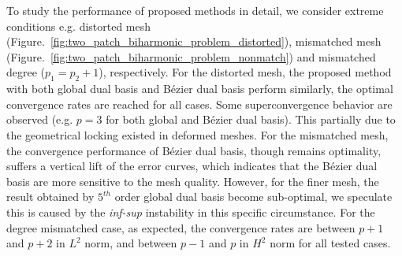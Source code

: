 \documentclass[preprint,12pt]{elsarticle}
\theoremstyle{remark}
\begin{document}
To study the performance of proposed methods in detail, we consider extreme conditions e.g. distorted mesh (Figure.~\ref{fig:two_patch_biharmonic_problem_distorted}), mismatched mesh (Figure.~\ref{fig:two_patch_biharmonic_problem_nonmatch}) and mismatched degree ($p_1=p_2+1$), respectively. For the distorted mesh, the proposed method with both global dual basis and B\'ezier dual basis perform similarly, the optimal convergence rates are reached for all cases. Some superconvergence behavior are observed (e.g. $p=3$ for both global and B\'ezier dual basis). This partially due to the geometrical locking existed in deformed meshes. For the mismatched mesh, the convergence performance of B\'ezier dual basis, though remains optimality, suffers a vertical lift of the error curves, which indicates that the B\'ezier dual basis are more sensitive to the mesh quality. However, for the finer mesh, the result obtained by $5^{th}$ order global dual basis become sub-optimal, we speculate this is caused by the \textit{inf-sup} instability in this specific circumstance. For the degree mismatched case, as expected, the convergence rates are between $p+1$ and $p+2$ in $L^2$ norm, and between $p-1$ and $p$ in $H^2$ norm for all tested cases. \par
\end{document}
